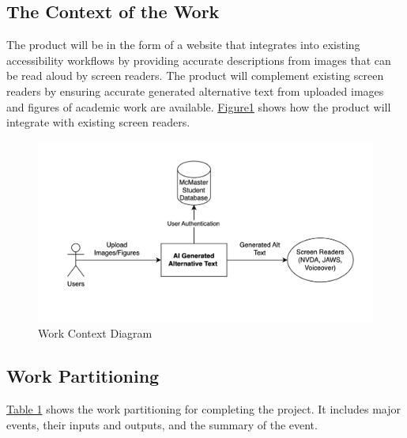 \documentclass[12pt]{article}
\begin{document}
\subsection{The Context of the Work}
The product will be in the form of a website that integrates into existing accessibility workflows
by providing accurate descriptions from images that can be read aloud by screen readers. The product 
will complement existing screen readers by ensuring accurate generated alternative text from 
uploaded images and figures of academic work are available. \href{fig:work-context}{Figure1} shows 
how the product will integrate with existing screen readers.\\
\begin{figure}[h]
  \centering
  \includegraphics[width=1.0\textwidth]{images/work-context-diagram.png}
  \caption{Work Context Diagram}
  \label{fig:work-context}
\end{figure}

\subsection{Work Partitioning}
\href{tab:work-partition}{Table 1} shows the work partitioning for completing the project. It includes major events, 
their inputs and outputs, and the summary of the event.
\end{document}

